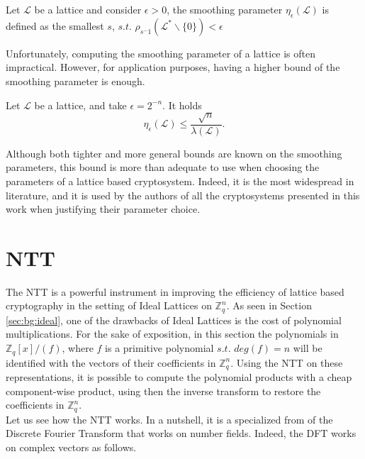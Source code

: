 \begin{definition}
Let $\mathscr{L}$ be a lattice and consider $\epsilon>0$, the smoothing parameter $\eta_\epsilon(\mathscr{L})$ is defined as the smallest $s$, $s.t.$ $\rho_{s^-1}(\mathscr{L}^*\backslash\{0\})<\epsilon$
\end{definition}

Unfortunately, computing the smoothing parameter of a lattice is often impractical. However, for application purposes, having a higher bound of the smoothing parameter is enough.

\begin{theorem}
Let $\mathscr{L}$ be a lattice, and take $\epsilon=2^{-n}$. It holds
\begin{equation*}
\eta_\epsilon(\mathscr{L})\leq\frac{\sqrt{n}}{\lambda\left(\mathscr{L}\right)}.
\end{equation*}
\end{theorem}

Although both tighter and more general bounds are known on the smoothing parameters, this bound is more than adequate to use when choosing the parameters of a lattice based cryptosystem. Indeed, it is the most widespread in literature, and it is used by the authors of all the cryptosystems presented in this work when justifying their parameter choice.

\section{NTT}\label{sec:bg:ntt}

The NTT is a powerful instrument in improving the efficiency of lattice based cryptography in the setting of Ideal Lattices on $\mathbb{Z}_q^n$. As seen in Section \ref{sec:bg:ideal}, one of the drawbacks of Ideal Lattices is the cost of polynomial multiplications. For the sake of exposition, in this section the polynomials in $\mathbb{Z}_q[x]/(f)$, where $f$ is a primitive polynomial $s.t.$ $deg(f)=n$ will be identified with the vectors of their coefficients in $\mathbb{Z}_q^n$. Using the NTT on these representations, it is possible to compute the polynomial products with a cheap component-wise product, using then the inverse transform to restore the coefficients in $\mathbb{Z}_q^n$.\\

Let us see how the NTT works. In a nutshell, it is a specialized from of the Discrete Fourier Transform that works on number fields. Indeed, the DFT works on complex vectors as follows.

